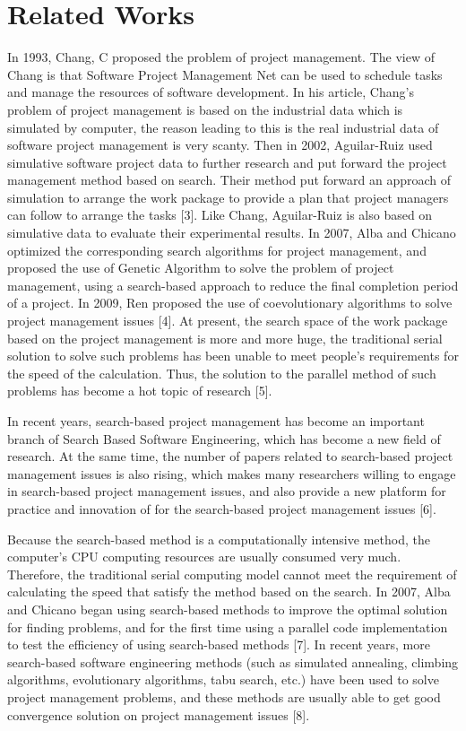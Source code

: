 
\chapter*{Related Works}
%

In 1993, Chang, C proposed the problem of project management.
The view of Chang is that Software Project Management Net can
be used to schedule tasks and manage the resources of software
development. In his article, Chang's problem of project management is based 
on the industrial data which is simulated by computer, the reason leading to 
this is the real industrial data of software project management is very 
scanty. Then in 2002, Aguilar-Ruiz used simulative software project data to 
further research and put forward the project management method based on 
search. Their method put forward an approach of simulation to arrange the 
work package to provide a plan that project managers can follow to arrange 
the tasks [3]. Like Chang, Aguilar-Ruiz is also based on simulative data to 
evaluate their experimental results. In 2007, Alba and Chicano optimized the 
corresponding search algorithms for project management, and proposed the use 
of Genetic Algorithm to solve the problem of project management, using a 
search-based approach to reduce the final completion period of a project. In 
2009, Ren proposed the use of coevolutionary algorithms to solve project 
management issues [4]. At present, the search space of the work package based 
on the project management is more and more huge, the traditional serial 
solution to solve such problems has been unable to meet people's requirements 
for the speed of the calculation. Thus, the solution to the parallel method 
of such problems has become a hot topic of research [5].


In recent years, search-based project management has become an important 
branch of Search Based Software Engineering, which has become a new field of 
research. At the same time, the number of papers related to search-based 
project management issues is also rising, which makes many researchers 
willing to engage in search-based project management issues, and also provide 
a new platform for practice and innovation of for the search-based project 
management issues [6].


Because the search-based method is a computationally intensive method, the 
computer's CPU computing resources are usually consumed very much. Therefore, 
the traditional serial computing model cannot meet the requirement of 
calculating the speed that satisfy the method based on the search. In 2007, 
Alba and Chicano began using search-based methods to improve the optimal 
solution for finding problems, and for the first time using a parallel code 
implementation to test the efficiency of using search-based methods [7]. In 
recent years, more search-based software engineering methods (such as 
simulated annealing, climbing algorithms, evolutionary algorithms, tabu 
search, etc.) have been used to solve project management problems, and these 
methods are usually able to get good convergence solution on project 
management issues [8].


